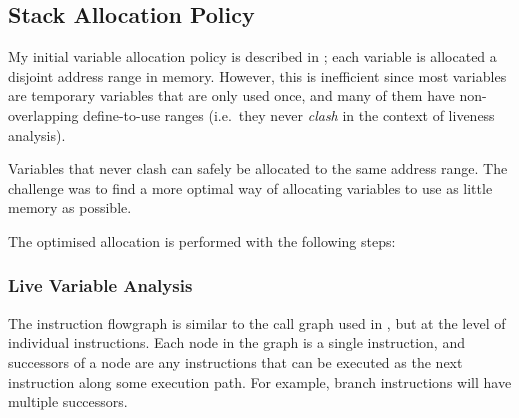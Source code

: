 \documentclass[00-main.tex]{subfiles}
\begin{document}
\subsection{Stack Allocation Policy}\label{sec:impl:optimised stack allocation}

My initial variable allocation policy is described in ; each variable is allocated a disjoint address range in memory.
However, this is inefficient since most variables are temporary variables that are only used once, and many of them have non-overlapping define-to-use ranges (i.e.\ they never \emph{clash} in the context of liveness analysis).

Variables that never clash can safely be allocated to the same address range.
The challenge was to find a more optimal way of allocating variables to use as little memory as possible.

The optimised allocation is performed with the following steps:


\subsubsection{Live Variable Analysis}

\newcommand{\lvadef}{\ensuremath{\mathit{def}}}
\newcommand{\lvaref}{\ensuremath{\mathit{ref}}}

The instruction flowgraph is similar to the call graph used in , but at the level of individual instructions.
Each node in the graph is a single instruction, and successors of a node are any instructions that can be executed as the next instruction along some execution path.
For example, branch instructions will have multiple successors.
\end{document}
